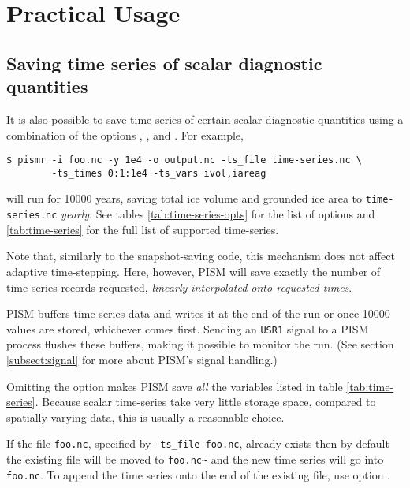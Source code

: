 
\section{Practical Usage}
\label{sec:practical-usage}

\subsection{Saving time series of scalar diagnostic quantities}
\label{sec:saving-time-series}
 It is also possible to save time-series of certain scalar diagnostic quantities using a combination of the options , , and .  For example,
\begin{verbatim}
$ pismr -i foo.nc -y 1e4 -o output.nc -ts_file time-series.nc \
        -ts_times 0:1:1e4 -ts_vars ivol,iareag
\end{verbatim} %
will run for 10000 years, saving total ice volume and grounded ice area to \texttt{time-series.nc} \emph{yearly}. See tables \ref{tab:time-series-opts} for the list of options and \ref{tab:time-series} for the full list of supported time-series.

Note that, similarly to the snapshot-saving code, this mechanism does not affect adaptive time-stepping.  Here, however, PISM will save exactly the number of time-series records requested, \emph{linearly interpolated onto requested times}.

PISM buffers time-series data and writes it at the end of the run or once 10000 values are stored, whichever comes first. Sending an \texttt{USR1} signal to a PISM process flushes these buffers, making it possible to monitor the run. (See section \ref{subsect:signal} for more about PISM's signal handling.)

Omitting the  option makes PISM save \emph{all} the variables listed in table \ref{tab:time-series}.  Because scalar time-series take very little storage space, compared to spatially-varying data, this is usually a reasonable choice.

If the file \verb|foo.nc|, specified by \verb|-ts_file foo.nc|, already exists then by default the existing file will be moved to \verb|foo.nc~| and the new time series will go into \verb|foo.nc|.  To append the time series onto the end of the existing file, use option .

